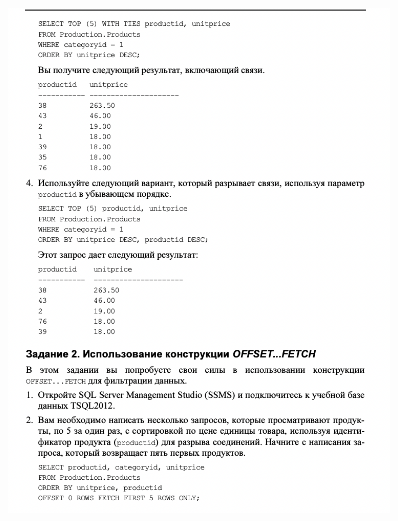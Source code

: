 \begin{figure}[h!]
	\begin{center}
		\includegraphics[width=0.9\textwidth]{img/ex4.png}
	\end{center}
	\captionsetup{justification=centering}
\end{figure}

